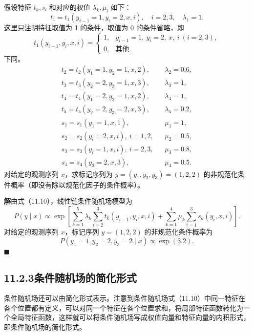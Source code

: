 \documentclass[UTF8, 12pt, fontset=fandol, oneside]{ctexart}
\begin{document}
假设特征 $t_k,s_l$ 和对应的权值 $\lambda_k,\mu_l$ 如下：
\[
t_1=t_1(y_{i-1}=1,y_i=2,x,i),\quad i=2,3,\quad \lambda_1=1.
\]
这里只注明特征取值为 1 的条件，取值为 0 的条件省略，即
\[
t_1(y_{i-1},y_i,x,i)=
\begin{cases}
1, & y_{i-1}=1,\ y_i=2,\ x,\ i\ (i=2,3),\\
0, & \text{其他}.
\end{cases}
\]
下同。
\[
\begin{array}{lll}
t_2=t_2(y_1=1,y_2=1,x,2), & & \lambda_2=0.6,\\
t_3=t_3(y_2=2,y_3=1,x,3), & & \lambda_3=1,\\
t_4=t_4(y_1=2,y_2=1,x,2), & & \lambda_4=1,\\
t_5=t_5(y_2=2,y_3=2,x,3), & & \lambda_5=0.2,\\
s_1=s_1(y_1=1,x,1), & & \mu_1=1,\\
s_2=s_2(y_i=2,x,i),\ i=1,2, & & \mu_2=0.5,\\
s_3=s_3(y_i=1,x,i),\ i=2,3, & & \mu_3=0.8,\\
s_4=s_4(y_3=2,x,3), & & \mu_4=0.5.
\end{array}
\]
对给定的观测序列 $x$，求标记序列为 $y=(y_1,y_2,y_3)=(1,2,2)$ 的非规范化条件概率（即没有除以规范化因子的条件概率）。

\noindent\textbf{解}\quad 由式（11.10），线性链条件随机场模型为
\[
P(y\mid x)\propto
\exp\left[
\sum_{k=1}^{5}\lambda_k\sum_{i=2}^{3}t_k(y_{i-1},y_i,x,i)
+\sum_{k=1}^{4}\mu_k\sum_{i=1}^{3}s_k(y_i,x,i)
\right].
\]
对给定的观测序列 $x$，标记序列 $y=(1,2,2)$ 的非规范化条件概率为
\[
P(y_1=1,y_2=2,y_3=2\mid x)\propto \exp(3.2).
\]
\hfill$\blacksquare$

\subsection*{11.2.3\quad 条件随机场的简化形式}

条件随机场还可以由简化形式表示。注意到条件随机场式（11.10）中同一特征在各个位置都有定义，可以对同一个特征在各个位置求和，将局部特征函数转化为一个全局特征函数，这样就可以将条件随机场写成权值向量和特征向量的内积形式，即条件随机场的简化形式。
\end{document}
